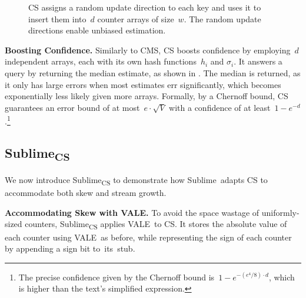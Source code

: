 \documentclass[sigconf]{acmart}
\newcommand{\sketch}{Sublime}
\newcommand{\sketchcs}{\sketch\textsubscript{CS}\xspace}
\newcommand{\counterencodingabbrv}{VALE}
\begin{document}
\begin{figure}
    \caption{CS assigns a random update direction to each key and uses it to
    insert them into~$d$ counter arrays of size~$w$. The random update
    directions enable unbiased estimation.}
    \label{fig:cs_overview}
\end{figure}
\fi

\textbf{Boosting Confidence.}
Similarly to CMS, CS boosts confidence by employing~$d$ independent arrays, each with its own hash functions~$h_i$ and $\sigma_i$.
It answers a query by returning the median estimate, as shown in .
The median is returned, as it only has large errors when most estimates err significantly, which becomes exponentially less likely given more arrays.
Formally, by a Chernoff bound, CS guarantees an error bound of at most~$e \cdot \sqrt{V}$ with a confidence of at least~$1-e^{-d}$.\footnote{The precise confidence given by the Chernoff bound is~$1-e^{-(e^4/8) \cdot d}$, which is higher than the text's simplified expression.}

\subsection{\sketchcs}\label{sec:cs_sublime}
We now introduce \sketchcs to demonstrate how \sketch\ adapts CS to accommodate both skew and stream growth.

\textbf{Accommodating Skew with \counterencodingabbrv.}
To avoid the space wastage of uniformly-sized counters, \sketchcs applies \counterencodingabbrv\ to CS.
It stores the absolute value of each counter using \counterencodingabbrv\ as before, while representing the sign of each counter by appending a sign bit \mbox{to its stub}. 
\end{document}
